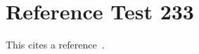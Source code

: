 \documentclass{article}
\begin{document}
\section{Reference Test 233}
This cites a reference~\cite{test233}.

\end{document}
